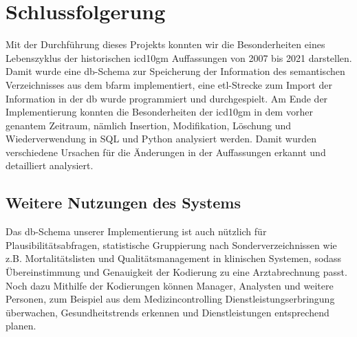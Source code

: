 \chapter{Schlussfolgerung} \label{ch:conclusion}

Mit der Durchführung dieses Projekts konnten wir die Besonderheiten eines Lebenszyklus der historischen \ac{icd10gm} Auffassungen von 2007 bis 2021 darstellen. Damit wurde eine \ac{db}-Schema zur Speicherung der Information des semantischen Verzeichnisses aus dem \ac{bfarm} implementiert, eine \ac{etl}-Strecke zum Import der Information in der \ac{db} wurde programmiert und durchgespielt. Am Ende der Implementierung konnten die Besonderheiten der \ac{icd10gm} in dem vorher genantem Zeitraum, nämlich Insertion, Modifikation, Löschung und Wiederverwendung in SQL und Python analysiert werden. Damit wurden verschiedene Ursachen für die Änderungen in der Auffassungen erkannt und detailliert analysiert.

\section{Weitere Nutzungen des Systems} \label{sec:future}

Das \ac{db}-Schema unserer Implementierung ist auch nützlich für Plausibilitätsabfragen, statistische Gruppierung nach Sonderverzeichnissen wie z.B. Mortalitätslisten und Qualitätsmanagement in klinischen Systemen, sodass Übereinstimmung und Genauigkeit der Kodierung zu eine Arztabrechnung passt. Noch dazu Mithilfe der Kodierungen können Manager, Analysten und weitere Personen, zum Beispiel aus dem Medizincontrolling Dienstleistungserbringung überwachen, Gesundheitstrends erkennen und Dienstleistungen entsprechend planen.
